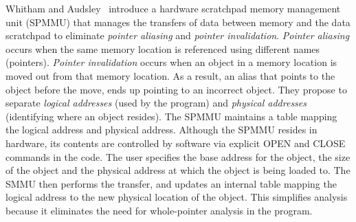  
Whitham and Audsley~\cite{whitham:09:timepredLoadStore} introduce a hardware scratchpad memory management unit (SPMMU) that manages the transfers of data between memory and the data scratchpad to eliminate \emph{pointer aliasing} and \emph{pointer invalidation}.
\emph{Pointer aliasing} occurs when the same memory location is referenced using different names (pointers). 
\emph{Pointer invalidation} occurs when an object in a memory location is moved out from that memory location.  
As a result, an alias that points to the object before the move, ends up pointing to an incorrect object.
They propose to separate \emph{logical addresses} (used by the program) and \emph{physical addresses} (identifying where an object resides).  
The SPMMU maintains a table mapping the logical address and physical address.   
Although the SPMMU resides in hardware, its contents are controlled by software via explicit OPEN and CLOSE commands in the code.  
The user specifies the base address for the object, the size of the object and the physical address at which the object is being loaded to. 
The SMMU then performs the transfer, and updates an internal table mapping the logical address to the new physical location of the object.  
This simplifies analysis because it eliminates the need for whole-pointer analysis in the program. 

